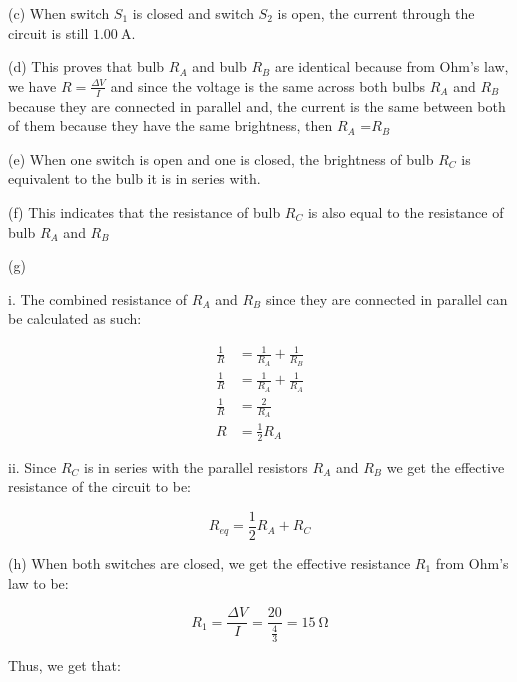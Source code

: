 \documentclass[12pt]{article}
\begin{document}
\bigskip

(c) When switch $S_1$ is closed and switch $S_2$ is open, the current through the circuit is still $\SI{1.00}{\ampere}$.

\bigskip

(d) This proves that bulb $R_A$ and bulb $R_B$ are identical because from Ohm's law, we have $R=\frac{\Delta V}{I}$ and since the voltage is the same across both bulbs $R_A$ and $R_B$ because they are connected in parallel and, the current is the same between both of them because they have the same brightness, then $R_A$ =$R_B$

\bigskip

(e) When one switch is open and one is closed, the brightness of bulb $R_C$ is equivalent to the bulb it is in series with.

\bigskip

(f) This indicates that the resistance of bulb $R_C$ is also equal to the resistance of bulb $R_A$ and $R_B$

\bigskip

(g)

\bigskip

i. The combined resistance of $R_A$ and $R_B$ since they are connected in parallel can be calculated as such:

\begin{equation*}
    \begin{split}
        \frac{1}{R} & = \frac{1}{R_A} + \frac{1}{R_B} \\
        \frac{1}{R} & = \frac{1}{R_A} + \frac{1}{R_A} \\
        \frac{1}{R} & = \frac{2}{R_A} \\
        R & = \frac{1}{2}R_A
    \end{split}
\end{equation*}

\bigskip

ii. Since $R_C$ is in series with the parallel resistors $R_A$ and $R_B$ we get the effective resistance of the circuit to be:

\[R_{eq} = \frac{1}{2}R_A + R_C \]

\bigskip

(h) When both switches are closed, we get the effective resistance $R_1$ from Ohm's law to be:

\bigskip

\[R_1 = \frac{\Delta V}{I} = \frac{20}{\frac{4}{3}} = \SI{15}{\ohm}\]

Thus, we get that:
\end{document}
